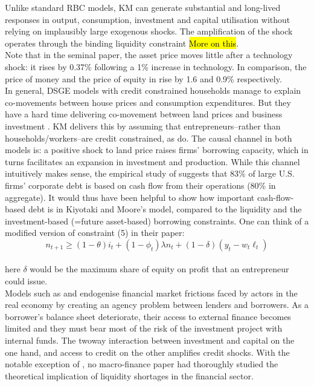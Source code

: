 \documentclass{amsart}
\theoremstyle{definition}
\theoremstyle{remark}
\numberwithin{equation}{section}
\begin{document}
Unlike standard RBC models, KM can generate substantial and long-lived responses in output, consumption, investment and capital utilisation without relying on implausibly large exogenous shocks. The amplification of the shock operates through the binding liquidity constraint \hl{More on this}.\\

Note that in the seminal \cite{kiyotaki1997credit} paper, the asset price moves little after a technology shock: it rises by 0.37\% following a 1\% increase in technology. In comparison, the price of money and the price of equity in \cite{kiyotaki2019liquidity} rise by 1.6 and 0.9\% respectively.\\

In general, DSGE models with credit constrained households manage to explain co-movements between house prices and consumption expenditures. But they have a hard time delivering co-movement between land prices and business investment \citep{iacoviello2010housing}. KM delivers this by assuming that entrepreneurs--rather than households/workers--are credit constrained, as \cite{liu2013land} do. The causal channel in both models is: a positive shock to land price raises firms' borrowing capacity, which in turns facilitates an expansion in investment and production. While this channel intuitively makes sense, the empirical study of \cite{lian2019anatomy} suggests that 83\% of large U.S. firms' corporate debt is based on cash flow from their operations (80\% in aggregate). It would thus have been helpful to show how important cash-flow-based debt is in Kiyotaki and Moore's model, compared to the liquidity and the investment-based (=future asset-based) borrowing constraints. One can think of a modified version of constraint (5) in their paper: $$n_{t+1} \geq(1-\theta) i_{t}+\left(1-\phi_{t}\right) \lambda n_{t} + (1-\delta)(y_t - w_t \ell_t) $$  \\
here $\delta$ would be the maximum share of equity on profit that an entrepreneur could issue.\\

Models such as \cite{bernanke1989agency} and \cite{kiyotaki1997credit} endogenise financial market frictions faced by actors in the real economy by creating an agency problem between lenders and borrowers. As a borrower's balance sheet deteriorate, their access to external finance becomes limited and they must bear most of the risk of the investment project with internal funds. The twoway interaction between investment and capital on the one hand, and access to credit on the other amplifies credit shocks. With the notable exception of \cite{holmstrom1997financial}, no macro-finance paper had thoroughly studied the theoretical implication of liquidity shortages in the financial sector. \\
\end{document}
